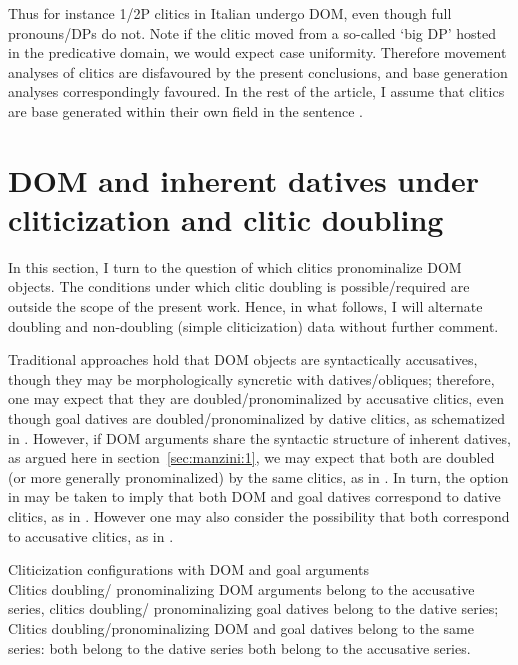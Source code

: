 \documentclass[output=paper,colorlinks,citecolor=brown]{./langscibook}
\begin{document}
Thus for instance 1/2P clitics in Italian undergo DOM, even though full pronouns/DPs do not. Note if the clitic moved from a so-called ‘big DP’ hosted in the predicative domain, we would expect case uniformity. Therefore movement analyses of clitics are disfavoured by the present conclusions, and base generation analyses correspondingly favoured. In the rest of the article, I assume that clitics are base generated within their own field in the sentence \citep{Sportiche1996}.

\section{DOM and inherent datives under cliticization and clitic doubling}\label{sec:manzini:3}

In this section, I turn to the question of which clitics pronominalize DOM objects. The conditions under which clitic doubling is possible/required are outside the scope of the present work. Hence, in what follows, I will alternate doubling and non-doubling (simple cliticization) data without further comment. 

Traditional approaches hold that DOM objects are syntactically accusatives, though they may be morphologically syncretic with datives/obliques; therefore, one may expect that they are doubled/pronominalized by accusative clitics, even though goal datives are doubled/pronominalized by dative clitics, as schematized in . However, if DOM arguments share the syntactic structure of inherent datives, as argued here in section~\ref{sec:manzini:1}, we may expect that both are doubled (or more generally pronominalized) by the same clitics, as in . In turn, the option in  may be taken to imply that both DOM and goal datives correspond to dative clitics, as in . However one may also consider the possibility that both correspond to accusative clitics, as in .

\ea%
    \label{ex:manzini:20}
    Cliticization configurations with DOM and goal arguments\\
    \ea\label{ex:manzini:20a} 
    Clitics doubling/ pronominalizing DOM arguments belong to the accusative series, clitics doubling/ pronominalizing goal datives belong to the dative series;
    \ex\label{ex:manzini:20b} 
    Clitics doubling/pronominalizing DOM and goal datives belong to the same series:
        \ea\label{ex:manzini:20bi} 
        both belong to the dative series
        \ex\label{ex:manzini:20bii} 
        both belong to the accusative series.
        \z
    \z
\z
\end{document}
